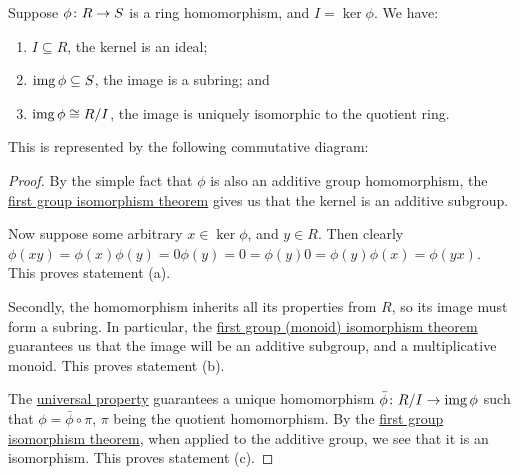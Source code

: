 \begin{theorem}\label{thm:iso-1-ring}
    Suppose \(\phi\colon R\to S\) is a ring homomorphism,
    and \(I = \ker\phi\).
    We have:
    \begin{enumerate}[label={(\alph*)}, itemsep=0mm]
        \item \(I \subseteq R\), the kernel is an ideal;
        \item \(\operatorname{img}\phi \subseteq S\), the image is a subring; and
        \item \(\operatorname{img}\phi \cong R/I\),
            the image is uniquely isomorphic to the quotient ring.
    \end{enumerate}

    This is represented by the following commutative diagram:
    \begin{center}
    \end{center}
\end{theorem}
\begin{proof}
    By the simple fact that \(\phi\) is also an additive group homomorphism,
    the \hyperref[thm:iso-1-group]{first group isomorphism theorem}
    gives us that the kernel is an additive subgroup.

    Now suppose some arbitrary \(x \in \ker\phi\), and \(y \in R\).
    Then clearly \(\phi(xy) = \phi(x)\phi(y) = 0\phi(y) = 0= 
    \phi(y)0 = \phi(y)\phi(x) = \phi(yx)\).
    This proves statement (a).

    \medskip

    Secondly, the homomorphism inherits all its properties from \(R\),
    so its image must form a subring.
    In particular,
    the \hyperref[thm:iso-1-group]{first group (monoid) isomorphism theorem}
    guarantees us that the image will be an additive subgroup,
    and a multiplicative monoid.
    This proves statement (b).

    \medskip

    The \hyperref[thm:univ-prop-quotient-ring]{universal property}
    guarantees a unique homomorphism \(\bar{\phi}\colon R/I\to\operatorname{img}\phi\)
    such that \(\phi = \bar{\phi}\circ\pi\),
    \(\pi\) being the quotient homomorphism.
    By the \hyperref[thm:iso-1-group]{first group isomorphism theorem},
    when applied to the additive group,
    we see that it is an isomorphism.
    This proves statement (c).
\end{proof}

